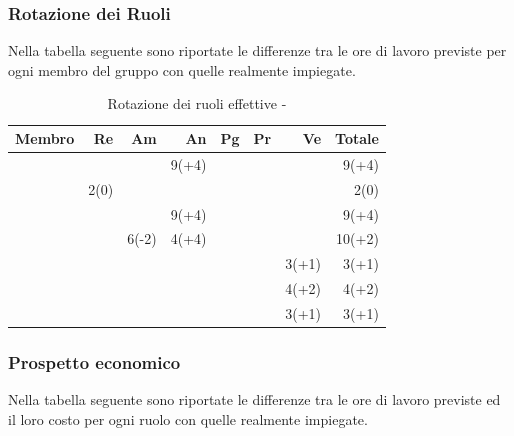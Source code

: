 \documentclass[12pt,a4paper]{article}
\begin{document}
\subsubsection{Rotazione dei Ruoli}
Nella tabella seguente sono riportate le differenze tra le ore di lavoro previste per ogni membro del gruppo con quelle realmente impiegate.

\begin{table}[H]
	\begin{center}
		\begin{tabular}{l r r r r r r r}
			\toprule
			\textbf{Membro}	&	\textbf{Re}	&	\textbf{Am}	& \textbf{An} & \textbf{Pg} & \textbf{Pr} & \textbf{Ve} & \textbf{Totale}\\
			\midrule
			\midrule
            \IB{} & & & 9(+4) & & & & 9(+4) \\
			\midrule
            \AB{} & 2(0) & & & & & & 2(0) \\
			\midrule
            \NDC{} & & & 9(+4) & & & & 9(+4) \\
			\midrule
            \TP{} & & 6(-2) & 4(+4) & & & & 10(+2) \\
			\midrule
            \WS{} & & & & & & 3(+1) & 3(+1) \\
			\midrule
            \AVE{} & & & & & & 4(+2) & 4(+2) \\
			\midrule
            \AVI{} & & & & & & 3(+1) & 3(+1) \\
			\bottomrule
		\end{tabular}
		\caption{Rotazione dei ruoli effettive - \FAD{}}
	\end{center}
\end{table}

\subsubsection{Prospetto economico}
Nella tabella seguente sono riportate le differenze tra le ore di lavoro previste ed il loro costo per ogni ruolo con quelle realmente impiegate.
\end{document}
